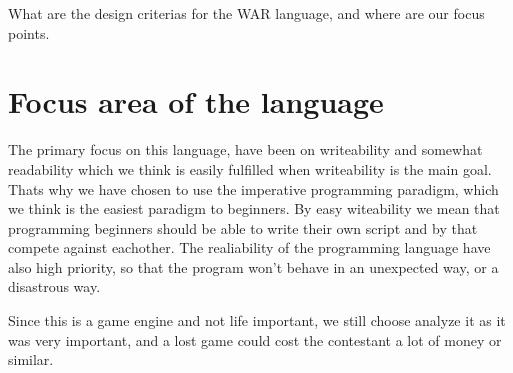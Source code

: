 What are the design criterias for the WAR language, and where are our focus points.

\section{Focus area of the language}

The primary focus on this language, have been on writeability and somewhat readability which we think is easily fulfilled when writeability is the main goal. Thats why we have chosen to use the imperative programming paradigm, which we think is the easiest paradigm to beginners. By easy witeability we mean that programming beginners should be able to write their own script and by that compete against eachother. The realiability of the programming language have also high priority, so that the program won't behave in an unexpected way, or a disastrous way.

Since this is a game engine and not life important, we still choose analyze it as it was very important, and a lost game could cost the contestant a lot of money or similar.

